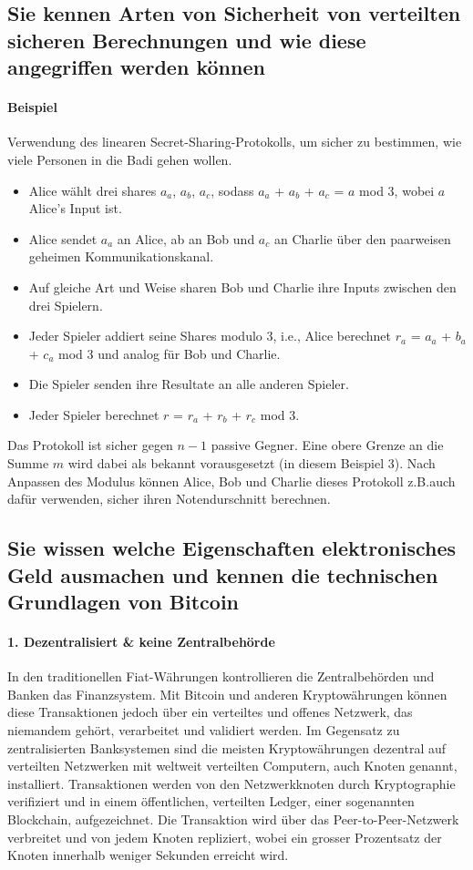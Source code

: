 \documentclass[10pt,a4paper]{article}
\begin{document}
\subsection*{Sie kennen Arten von Sicherheit von verteilten sicheren Berechnungen und wie diese angegriffen werden können}
\paragraph*{Beispiel}Verwendung des linearen Secret-Sharing-Protokolls, um sicher zu bestimmen, wie viele Personen in die Badi gehen wollen.
\begin{itemize}[noitemsep,topsep=0pt,leftmargin=*]
    \item Alice wählt drei shares $a_a$, $a_b$, $a_c$, sodass $a_a$ + $a_b$ + $a_c$ = $a$ mod 3, wobei $a$ Alice’s Input ist.
    \item Alice sendet $a_a$ an Alice, ab an Bob und $a_c$ an Charlie über den paarweisen geheimen Kommunikationskanal.
    \item Auf gleiche Art und Weise sharen Bob und Charlie ihre Inputs zwischen den drei Spielern.
    \item Jeder Spieler addiert seine Shares modulo 3, i.e., Alice berechnet $r_a$ = $a_a$ + $b_a$ + $c_a$ mod 3 und analog für Bob und Charlie.
    \item Die Spieler senden ihre Resultate an alle anderen Spieler.
    \item Jeder Spieler berechnet $r$ = $r_a$ + $r_b$ + $r_c$ mod 3.
\end{itemize}
Das Protokoll ist sicher gegen $n - 1$ passive Gegner. Eine obere Grenze an die Summe $m$ wird dabei als bekannt vorausgesetzt (in diesem Beispiel 3). Nach Anpassen des Modulus können Alice, Bob und Charlie dieses Protokoll z.B.auch dafür verwenden, sicher ihren Notendurschnitt berechnen.

\subsection*{Sie wissen welche Eigenschaften elektronisches Geld ausmachen und kennen die technischen Grundlagen von Bitcoin}
\paragraph*{1. Dezentralisiert \& keine Zentralbehörde}
In den traditionellen Fiat-Währungen kontrollieren die Zentralbehörden und Banken das Finanzsystem. Mit Bitcoin und anderen Kryptowährungen können diese Transaktionen jedoch über ein verteiltes und offenes Netzwerk, das niemandem gehört, verarbeitet und validiert werden. Im Gegensatz zu zentralisierten Banksystemen sind die meisten Kryptowährungen dezentral auf verteilten Netzwerken mit weltweit verteilten Computern, auch Knoten genannt, installiert. Transaktionen werden von den Netzwerkknoten durch Kryptographie verifiziert und in einem öffentlichen, verteilten Ledger, einer sogenannten Blockchain, aufgezeichnet. Die Transaktion wird über das Peer-to-Peer-Netzwerk verbreitet und von jedem Knoten repliziert, wobei ein grosser Prozentsatz der Knoten innerhalb weniger Sekunden erreicht wird.
\end{document}
